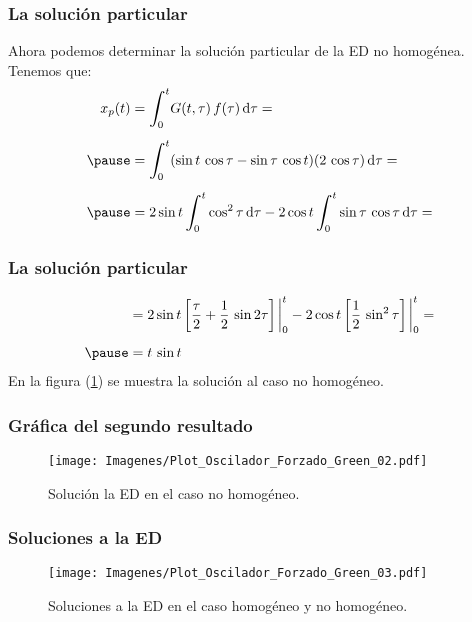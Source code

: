 \documentclass[12pt]{beamer}
\begin{document}
\begin{frame}
\frametitle{La solución particular}
Ahora podemos determinar la solución particular de la ED no homogénea. \pause Tenemos que:
\pause
\begin{eqnarray*}
\begin{aligned}
x_{p} (t) &= \scaleint{6ex}_{\bs 0}^{t} G (t, \tau) \, f (\tau) \dd{\tau} = \\[0.5em]  \pause
&= \scaleint{6ex}_{\bs 0}^{t} (\sin t \, \cos \tau - \sin \tau \, \cos t) (2 \, \cos \tau) \dd{\tau} = \\[0.5em] \pause
&= 2 \sin t \, \scaleint{6ex}_{\bs 0}^{t} \cos^{2} \tau \dd{\tau} - 2 \cos t \, \scaleint{6ex}_{\bs 0}^{t} \sin \tau \, \cos \tau \dd{\tau} =
\end{aligned}
\end{eqnarray*}
\end{frame}

\begin{frame}
\frametitle{La solución particular}
\begin{eqnarray}
\begin{aligned}    
&= 2 \sin t \, \bigg[ \dfrac{\tau}{2} + \dfrac{1}{2} \, \sin 2 \tau \bigg] \eval_{0}^{t} - 2 \cos t \, \bigg[ \dfrac{1}{2} \, \sin^{2} \tau \bigg] \eval_{0}^{t} = \\[0.5em] \pause
&= t \, \sin t
\end{aligned}
\label{eq:ecuacion_07_24}
\end{eqnarray}
En la figura (\ref{fig:figura_02}) se muestra la solución al caso no homogéneo.
\end{frame}

\begin{frame}
\frametitle{Gráfica del segundo resultado}
\begin{figure}[H]
    \centering
    \texttt{[image: Imagenes/Plot\_Oscilador\_Forzado\_Green\_02.pdf]}
    \caption{Solución la ED en el caso no homogéneo.}
    \label{fig:figura_02}
\end{figure}
\end{frame}

\begin{frame}
\frametitle{Soluciones a la ED}
\begin{figure}[H]
    \centering
    \texttt{[image: Imagenes/Plot\_Oscilador\_Forzado\_Green\_03.pdf]}
    \caption{Soluciones a la ED en el caso homogéneo y no homogéneo.}
    \label{fig:figura_03}
\end{figure}
\end{frame}
\end{document}
